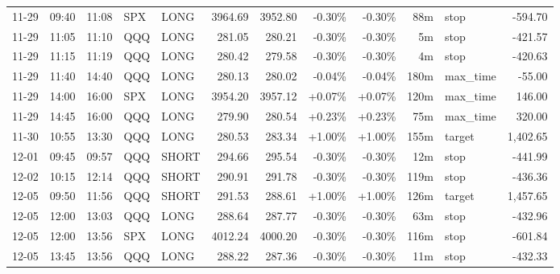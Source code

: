 \documentclass[11pt,a4paper]{article}
\begin{document}
\begin{center}
\begin{longtable}{>{\color{txtmain}}l l l l l r r r r r >{\color{txtmain}}l r}
11-29 & 09:40 & 11:08 & SPX & LONG & 3964.69 & 3952.80 & \textcolor{lossred}{-0.30\%} & \textcolor{lossred}{-0.30\%} & 88m & stop & \textcolor{lossred}{-594.70} \\
11-29 & 11:05 & 11:10 & QQQ & LONG & 281.05 & 280.21 & \textcolor{lossred}{-0.30\%} & \textcolor{lossred}{-0.30\%} & 5m & stop & \textcolor{lossred}{-421.57} \\
11-29 & 11:15 & 11:19 & QQQ & LONG & 280.42 & 279.58 & \textcolor{lossred}{-0.30\%} & \textcolor{lossred}{-0.30\%} & 4m & stop & \textcolor{lossred}{-420.63} \\
11-29 & 11:40 & 14:40 & QQQ & LONG & 280.13 & 280.02 & \textcolor{lossred}{-0.04\%} & \textcolor{lossred}{-0.04\%} & 180m & max\_time & \textcolor{lossred}{-55.00} \\
11-29 & 14:00 & 16:00 & SPX & LONG & 3954.20 & 3957.12 & \textcolor{wingreen}{+0.07\%} & \textcolor{wingreen}{+0.07\%} & 120m & max\_time & \textcolor{wingreen}{146.00} \\
11-29 & 14:45 & 16:00 & QQQ & LONG & 279.90 & 280.54 & \textcolor{wingreen}{+0.23\%} & \textcolor{wingreen}{+0.23\%} & 75m & max\_time & \textcolor{wingreen}{320.00} \\
11-30 & 10:55 & 13:30 & QQQ & LONG & 280.53 & 283.34 & \textcolor{wingreen}{+1.00\%} & \textcolor{wingreen}{+1.00\%} & 155m & target & \textcolor{wingreen}{1,402.65} \\
12-01 & 09:45 & 09:57 & QQQ & SHORT & 294.66 & 295.54 & \textcolor{lossred}{-0.30\%} & \textcolor{lossred}{-0.30\%} & 12m & stop & \textcolor{lossred}{-441.99} \\
12-02 & 10:15 & 12:14 & QQQ & SHORT & 290.91 & 291.78 & \textcolor{lossred}{-0.30\%} & \textcolor{lossred}{-0.30\%} & 119m & stop & \textcolor{lossred}{-436.36} \\
12-05 & 09:50 & 11:56 & QQQ & SHORT & 291.53 & 288.61 & \textcolor{wingreen}{+1.00\%} & \textcolor{wingreen}{+1.00\%} & 126m & target & \textcolor{wingreen}{1,457.65} \\
12-05 & 12:00 & 13:03 & QQQ & LONG & 288.64 & 287.77 & \textcolor{lossred}{-0.30\%} & \textcolor{lossred}{-0.30\%} & 63m & stop & \textcolor{lossred}{-432.96} \\
12-05 & 12:00 & 13:56 & SPX & LONG & 4012.24 & 4000.20 & \textcolor{lossred}{-0.30\%} & \textcolor{lossred}{-0.30\%} & 116m & stop & \textcolor{lossred}{-601.84} \\
12-05 & 13:45 & 13:56 & QQQ & LONG & 288.22 & 287.36 & \textcolor{lossred}{-0.30\%} & \textcolor{lossred}{-0.30\%} & 11m & stop & \textcolor{lossred}{-432.33} \\

\end{longtable}
\end{center}
\end{document}
